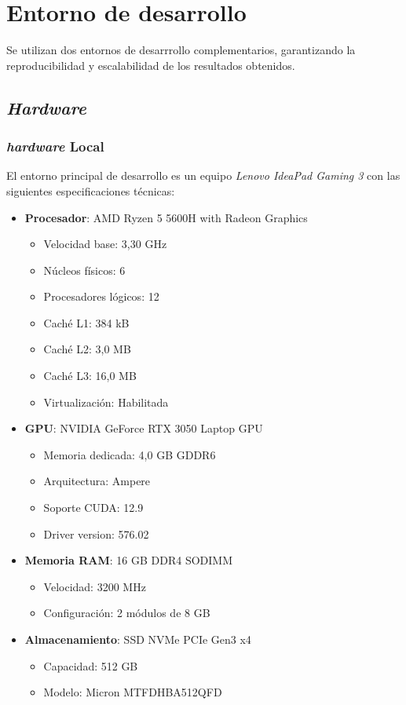 \documentclass[12pt,a4paper,onecolumn,oneside]{report}
\begin{document}
\section{Entorno de desarrollo}
\label{sec:Entorno de desarrollo}
Se utilizan dos entornos de desarrrollo complementarios, garantizando la reproducibilidad y escalabilidad de los resultados obtenidos.

\subsection{\textit{Hardware}}
\subsubsection{\textit{hardware} Local}
\label{sec:hardware_local}
El entorno principal de desarrollo es un equipo \textit{Lenovo IdeaPad Gaming 3} con las siguientes especificaciones técnicas:

\begin{itemize}
    \item \textbf{Procesador}: AMD Ryzen 5 5600H with Radeon Graphics
    \begin{itemize}
        \item Velocidad base: 3,30 GHz
        \item Núcleos físicos: 6
        \item Procesadores lógicos: 12
        \item Caché L1: 384 kB
        \item Caché L2: 3,0 MB  
        \item Caché L3: 16,0 MB
        \item Virtualización: Habilitada
    \end{itemize}
    
    \item \textbf{GPU}: NVIDIA GeForce RTX 3050 Laptop GPU
    \begin{itemize}
        \item Memoria dedicada: 4,0 GB GDDR6
        \item Arquitectura: Ampere
        \item Soporte CUDA: 12.9
        \item Driver version: 576.02
    \end{itemize}
    
    \item \textbf{Memoria RAM}: 16 GB DDR4 SODIMM
    \begin{itemize}
        \item Velocidad: 3200 MHz
        \item Configuración: 2 módulos de 8 GB
    \end{itemize}
    
    \item \textbf{Almacenamiento}: SSD NVMe PCIe Gen3 x4
    \begin{itemize}
        \item Capacidad: 512 GB
        \item Modelo: Micron MTFDHBA512QFD
    \end{itemize}
\end{itemize}
\end{document}
